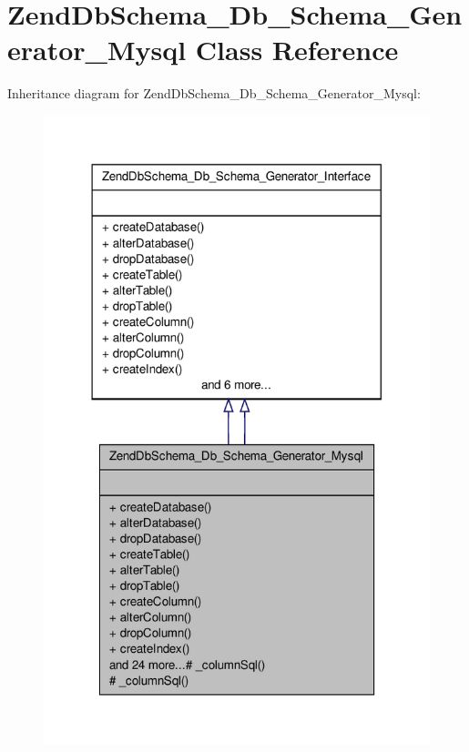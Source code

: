 \hypertarget{classZendDbSchema__Db__Schema__Generator__Mysql}{\section{\-Zend\-Db\-Schema\-\_\-\-Db\-\_\-\-Schema\-\_\-\-Generator\-\_\-\-Mysql \-Class \-Reference}
\label{classZendDbSchema__Db__Schema__Generator__Mysql}
}


\-Inheritance diagram for \-Zend\-Db\-Schema\-\_\-\-Db\-\_\-\-Schema\-\_\-\-Generator\-\_\-\-Mysql\-:\nopagebreak
\begin{figure}[H]
\begin{center}
\leavevmode
\includegraphics[width=318pt]{classZendDbSchema__Db__Schema__Generator__Mysql__inherit__graph}
\end{center}
\end{figure}



